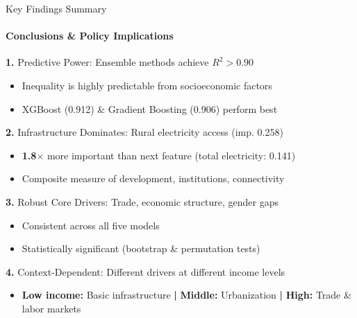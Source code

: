 \documentclass[aspectratio=169,8pt]{beamer}
\begin{document}
    \begin{frame}{Key Findings Summary}
        \framesubtitle{Conclusions \& Policy Implications}

        \begin{exampleblock}{\textbf{1.} Predictive Power: Ensemble methods achieve $R^2 > 0.90$}
            \begin{itemize}
                \item Inequality is highly predictable from socioeconomic factors
                \item XGBoost (0.912) \& Gradient Boosting (0.906) perform best
            \end{itemize}
        \end{exampleblock}

        \begin{exampleblock}{\textbf{2.} Infrastructure Dominates: Rural electricity access (imp. 0.258)}
            \begin{itemize}
                \item \textbf{1.8$\times$} more important than next feature (total electricity: 0.141)
                \item Composite measure of development, institutions, connectivity
            \end{itemize}
        \end{exampleblock}

        \begin{exampleblock}{\textbf{3.} Robust Core Drivers: Trade, economic structure, gender gaps}
            \begin{itemize}
                \item Consistent across all five models
                \item Statistically significant (bootstrap \& permutation tests)
            \end{itemize}
        \end{exampleblock}

        \begin{exampleblock}{\textbf{4.} Context-Dependent: Different drivers at different income levels}
            \begin{itemize}
                \item \textbf{Low income:} Basic infrastructure \textbf{|} \textbf{Middle:} Urbanization \textbf{|} \textbf{High:} Trade \& labor markets
            \end{itemize}
        \end{exampleblock}
    \end{frame}
\end{document}
